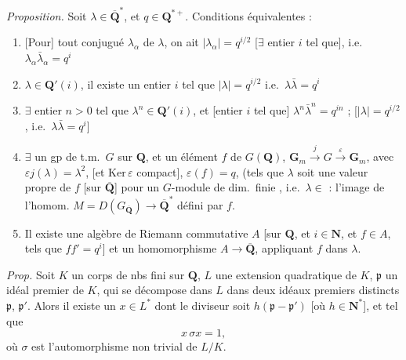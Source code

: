 \documentclass[11pt,a4paper]{article}
\begin{document}
\emph{Proposition.} Soit $\lambda \in \overline{\mathbf{Q}}^{*}$, et
$q \in \mathbf{Q}^{*+}$. Conditions équivalentes :
\begin{enumerate}
  \item[(i)]  [Pour] tout
  conjugué $\lambda_{\alpha}$ de $\lambda$, on ait
  $|\lambda_{\alpha}| = q^{i/2}$ [$\exists$ entier $i$ tel que],
  i.e.\ $\lambda_{\alpha}\bar{\lambda}_{\alpha} = q^{i}$
  \item[(ii)] $\lambda \in \mathbf{Q}'(i)$, il existe un entier $i$ tel
  que $|\lambda| = q^{i/2}$ i.e.\ $\lambda\bar{\lambda} = q^{i}$
  \item[(ii bis)] $\exists$ entier $n > 0$ tel que
  $\lambda^{n} \in \mathbf{Q}'(i)$, et \struck{$\exists$} [entier $i$ tel
  que] $\lambda^{n}\bar{\lambda}^{n} = q^{in}$ ; [$|\lambda| = q^{i/2}$,
  i.e.\ $\lambda\bar{\lambda} = q^{i}$]
  \item[(iii)] $\exists$ un gp de t.m.\ $G$ sur $\mathbf{Q}$, et un
  élément $f$ de $G(\mathbf{Q})$,
  $\mathbf{G}_m \xrightarrow{\;j\;} G \xrightarrow{\;\varepsilon\;} \mathbf{G}_m$,
  avec $\varepsilon j(\lambda) = \lambda^{2}$, 
  [et $\mathrm{Ker}\,\varepsilon$ compact], $\varepsilon(f) = q$, (tels que
  $\lambda$ soit une valeur propre de $f$ [sur $\overline{\mathbf{Q}}$]
  pour un $G$-module de dim.\ finie \ill{}, i.e.\ $\lambda \in$ \ill{} :
  l'image de l'homom.
  $M = D(G_{\overline{\mathbf{Q}}}) \to \overline{\mathbf{Q}}^{*}$
  défini par $f$.
  \item[(iv)] Il existe une algèbre de Riemann commutative
  $A$ [sur $\mathbf{Q}$, et $i \in \mathbf{N}$, et $f \in A$, tels que
  $ff' = q^{i}$] et un homomorphisme $A \to \overline{\mathbf{Q}}$,
  appliquant $f$ dans $\lambda$.
\end{enumerate}

\emph{Prop.} Soit $K$ un corps de nbs fini sur $\mathbf{Q}$, $L$ une
extension quadratique de $K$, $\mathfrak{p}$ un idéal premier de $K$,
 qui se décompose dans $L$ dans deux
idéaux premiers distincts $\mathfrak{p}$, $\mathfrak{p}'$. Alors il existe
un $x \in L^{*}$   dont le
diviseur soit $h(\mathfrak{p} - \mathfrak{p}')$ [où $h \in \mathbf{N}^{*}$],
et tel que
\[
  x\,\sigma x = 1 ,
\]
où $\sigma$ est l'automorphisme non trivial de $L/K$.
\end{document}
